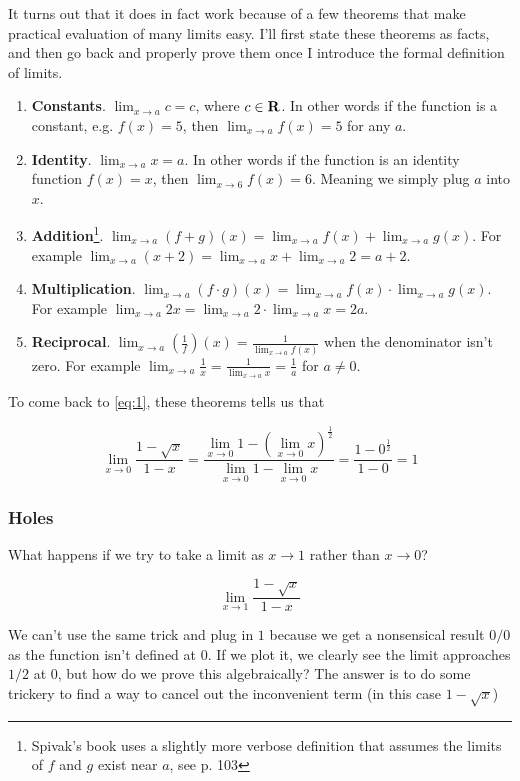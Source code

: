 It turns out that it does in fact work because of a few theorems that
make practical evaluation of many limits easy. I'll first state these
theorems as facts, and then go back and properly prove them once I
introduce the formal definition of limits.

\begin{enumerate}
\item \textbf{Constants}. $\lim_{x\to a}c=c$, where $c\in\mathbf{R}$. In other
  words if the function is a constant, e.g. $f(x)=5$, then
  $\lim_{x\to a}f(x)=5$ for any $a$.
\item \textbf{Identity}. $\lim_{x\to a}x=a$. In other words if the
  function is an identity function $f(x)=x$, then
  $\lim_{x\to 6}f(x)=6$. Meaning we simply plug $a$ into $x$.
\item \textbf{Addition}\footnote{Spivak's book uses a slightly more
    verbose definition that assumes the limits of $f$ and $g$ exist
    near $a$, see p. 103}.
  $\lim_{x\to a}(f+g)(x)=\lim_{x\to a}f(x)+\lim_{x\to a}g(x)$. For example
  $\lim_{x\to a}(x+2)=\lim_{x\to a}x+\lim_{x\to a}2=a+2$.
\item \textbf{Multiplication}.
  $\lim_{x\to a}(f\cdot g)(x)=\lim_{x\to a}f(x)\cdot \lim_{x\to a}g(x)$. For example
  $\lim_{x\to a}2x=\lim_{x\to a}2\cdot \lim_{x\to a}x=2a$.
\item \textbf{Reciprocal}.
  $\lim_{x\to a}\left(\frac{1}{f}\right)(x)=\frac{1}{\lim_{x\to a}f(x)}$
  when the denominator isn't zero. For example
  $\lim_{x\to a}\frac{1}{x}=\frac{1}{\lim_{x\to a}x}=\frac{1}{a}$ for
  $a\neq0$.
\end{enumerate}

To come back to \ref{eq:1}, these theorems tells us that

\[\lim_{x\to 0}\frac{1-\sqrt{x}}{1-x}=\frac{\lim_{x\to 0}1-(\lim_{x\to 0}x)^{\frac{1}{2}}}{\lim_{x\to 0}1-\lim_{x\to 0}x}=\frac{1-0^{\frac{1}{2}}}{1-0}=1\]

\subsubsection*{Holes}

What happens if we try to take a limit as $x\to 1$ rather than $x\to 0$?

\[\lim_{x\to 1}\frac{1-\sqrt{x}}{1-x}\]

We can't use the same trick and plug in $1$ because we get a
nonsensical result $0/0$ as the function isn't defined at $0$. If we
plot it, we clearly see the limit approaches $1/2$ at $0$, but how do
we prove this algebraically? The answer is to do some trickery to find
a way to cancel out the inconvenient term (in this case $1-\sqrt{x}$)


